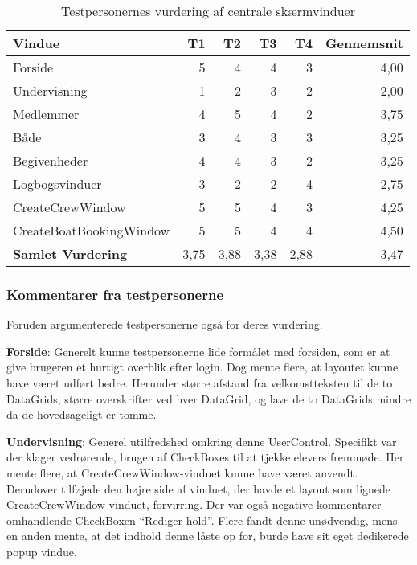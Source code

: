 \begin{table}[htbp]
    \centering
    \begin{tabular}{l|rrrr|r}
        \textbf{Vindue} & T1 & T2 & T3 & T4 & \textbf{Gennemsnit} \\
        \midrule
        Forside & 5 & 4 & 4 & 3 & 4,00 \\
        Undervisning & 1 & 2 & 3 & 2 & 2,00 \\
        Medlemmer & 4 & 5 & 4 & 2 & 3,75 \\
        Både & 3 & 4 & 3 & 3 & 3,25 \\
        Begivenheder & 4 & 4 & 3 & 2 & 3,25 \\
        Logbogsvinduer & 3 & 2 & 2 & 4 & 2,75 \\
        CreateCrewWindow & 5 & 5 & 4 & 3 & 4,25 \\
        CreateBoatBookingWindow & 5 & 5 & 4 & 4 & 4,50 \\ \hline
        \textbf{Samlet Vurdering} & 3,75 & 3,88 & 3,38 & 2,88 & 3,47 \\
    \end{tabular}%
        \caption{Testpersonernes vurdering af centrale skærmvinduer}
    \label{tab:vurderingtest}%
\end{table}%

\subsubsection*{Kommentarer fra testpersonerne}
Foruden  argumenterede testpersonerne også for deres vurdering.

\textbf{Forside}: 
Generelt kunne testpersonerne lide formålet med forsiden, som er at give brugeren et hurtigt overblik efter login. 
Dog mente flere, at layoutet kunne have været udført bedre.
Herunder større afstand fra velkomstteksten til de to DataGrids, større overskrifter ved hver DataGrid, og lave de to DataGrids mindre da de hovedsageligt er tomme. 

\textbf{Undervisning}: 
Generel utilfredshed omkring denne UserControl.
Specifikt var der klager vedrørende, brugen af CheckBoxes til at tjekke elevers fremmøde.
Her mente flere, at CreateCrewWindow-vinduet kunne have været anvendt. 
Derudover tilføjede den højre side af vinduet, der havde et layout som lignede CreateCrewWindow-vinduet, forvirring. 
Der var også negative kommentarer omhandlende CheckBoxen ``Rediger hold''. 
Flere fandt denne unødvendig, mens en anden mente, at det indhold denne låste op for, burde have sit eget dedikerede popup vindue.

